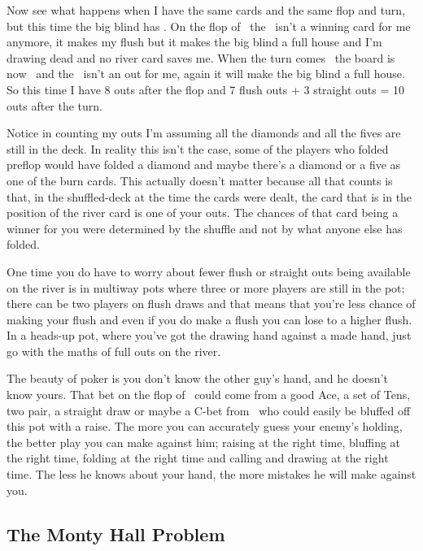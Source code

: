 
Now see what happens when I have the same cards and the same flop and
turn, but this time the big blind has \As\Ah. On the flop of
\Ad\tens\eigd\, the \tend\ isn't a winning card for me anymore, it
makes my flush but it makes the big blind a full house and I'm drawing
dead and no river card saves me. When the turn comes \twoc\, the board
is now \Ad\tens\eigd\twoc\ and the \twod\ isn't an out for me, again
it will make the big blind a full house. So this time I have 8 outs
after the flop and 7 flush outs + 3 straight outs = 10 outs after the
turn.

Notice in counting my outs I'm assuming all the diamonds and all the
fives are still in the deck. In reality this isn't the case, some of
the players who folded preflop would have folded a diamond and maybe
there's a diamond or a five as one of the burn cards. This actually
doesn't matter because all that counts is that, in the shuffled-deck
at the time the cards were dealt, the card that is in the position of
the river card is one of your outs. The chances of that card being a
winner for you were determined by the shuffle and not by what anyone
else has folded.

One time you do have to worry about fewer flush or straight outs being
available on the river is in multiway pots where three or more players
are still in the pot; there can be two players on flush draws and that
means that you're less chance of making your flush and even if you do
make a flush you can lose to a higher flush. In a heads-up
pot, where you've got the drawing hand against a made hand, just go
with the maths of full outs on the river.

The beauty of poker is you don't know the other guy's hand, and he
doesn't know yours. That bet on the flop of \Ad\tens\eigd\ could come
from a good Ace, a set of Tens, two pair, a straight draw or maybe a
C-bet from \sixh\sixc\ who could easily be bluffed off this pot with a
raise. The more you can accurately guess your enemy's holding, the
better play you can make against him; raising at the right time,
bluffing at the right time, folding at the right time and calling and
drawing at the right time. The less he knows about your hand, the more
mistakes he will make against you.

\subsection{The Monty Hall Problem}


